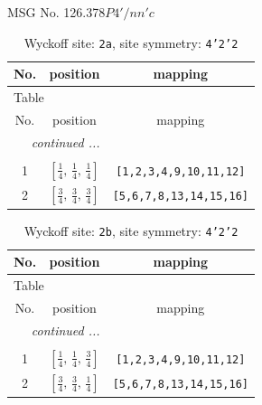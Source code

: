 \documentclass[fleqn,8pt]{jsarticle}
\begin{document}
\setcounter{MaxMatrixCols}{32}

\renewcommand{\tablename}{Table~}
\renewcommand{\figurename}{Figure~}
\begin{center}
\LARGE
MSG No. 126.378\quad$P4'/nn'c$
\end{center}
\renewcommand{\arraystretch}{1.2}
\begin{longtable}{ccc}
\caption{Wyckoff site: {\tt 2a}, site symmetry: {\tt 4'2'2}}
 \\
 \hline \hline
No. & position & mapping \\ \hline \endfirsthead

\multicolumn{2}{l}{\tablename\ \thetable{}} \\
 \hline \hline
No. & position & mapping \\ \hline \endhead

 \hline \hline
\multicolumn{2}{r}{\footnotesize\it continued ...} \\ \endfoot

 \hline \hline
\multicolumn{2}{r}{} \\ \endlastfoot

1 & $\left[ \frac{1}{4},\, \frac{1}{4},\, \frac{1}{4} \right]$ & {\tt [1,2,3,4,9,10,11,12]} \\ \hline
2 & $\left[ \frac{3}{4},\, \frac{3}{4},\, \frac{3}{4} \right]$ & {\tt [5,6,7,8,13,14,15,16]} \\
\end{longtable}
\renewcommand{\arraystretch}{1.2}
\begin{longtable}{ccc}
\caption{Wyckoff site: {\tt 2b}, site symmetry: {\tt 4'2'2}}
 \\
 \hline \hline
No. & position & mapping \\ \hline \endfirsthead

\multicolumn{2}{l}{\tablename\ \thetable{}} \\
 \hline \hline
No. & position & mapping \\ \hline \endhead

 \hline \hline
\multicolumn{2}{r}{\footnotesize\it continued ...} \\ \endfoot

 \hline \hline
\multicolumn{2}{r}{} \\ \endlastfoot

1 & $\left[ \frac{1}{4},\, \frac{1}{4},\, \frac{3}{4} \right]$ & {\tt [1,2,3,4,9,10,11,12]} \\ \hline
2 & $\left[ \frac{3}{4},\, \frac{3}{4},\, \frac{1}{4} \right]$ & {\tt [5,6,7,8,13,14,15,16]} \\
\end{longtable}
\end{document}

